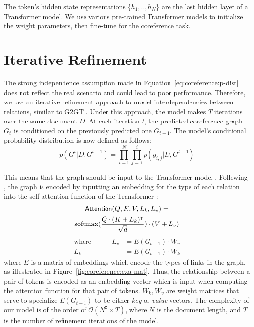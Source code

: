 \documentclass[11pt]{article}
\begin{document}
The token's hidden state representations $\{h_1,..,h_N\}$ are the last hidden layer of a Transformer model. We use various pre-trained Transformer models to initialize the weight parameters, then fine-tune for the coreference task.






\section{Iterative Refinement} 
\label{sec:coreference:ite}

The strong independence assumption made in Equation~\eqref{eq:coreference:p-dist} does not reflect the real scenario and could lead to poor performance. Therefore, we use an iterative refinement approach to model interdependencies between relations, similar to G2GT \cite{mohammadshahi2020recursive}. Under this approach, the model makes $T$ iterations over the same document $D$. At each iteration $t$, the predicted coreference graph $G_t$ is conditioned on the previously predicted one $G_{t-1}$. The model's conditional probability distribution is now defined as follows:
\begin{equation}
p(G^t|D, G^{t-1}) = \prod_{i=1}^N \prod_{j=1}^i p(g_{i,j}|D, G^{t-1})
\end{equation}

This means that the graph should be input to the Transformer model \cite{vaswani2017attention}.  
Following \cite{mohammadshahi2020recursive}, the graph is encoded by inputting an embedding for the type of each relation into the self-attention function of the Transformer :
\begin{multline}
	\mathsf{Attention}(Q, K, V, L_k, L_v) = \cr \textrm{softmax}(\frac{Q \cdot (K+L_k)^{\intercal}}{\sqrt{d}}) \cdot (V + L_v) 
\end{multline}
\vspace{-25pt}
\begin{align}
	\text{where} \quad \quad \quad L_v &= E(G_{t-1}) \cdot W_v  \nonumber \\
	L_k &= E(G_{t-1}) \cdot W_k \nonumber
\end{align}
where $E$ is a matrix of embeddings which encode the types of links in the graph, as illustrated in Figure~\ref{fig:coreference:exa-mat}. Thus, the relationship between a pair of tokens is encoded as an embedding vector which is input when computing the attention function for that pair of tokens. $W_k, W_v$ are weight matrices that serve to specialize $E(G_{t-1})$ to be either \emph{key} or \emph{value} vectors. The complexity of our model is of the order of $\mathcal{O}(N^2 \times T)$, where $N$ is the document length, and $T$ is the number of refinement iterations of the model. 
\end{document}
